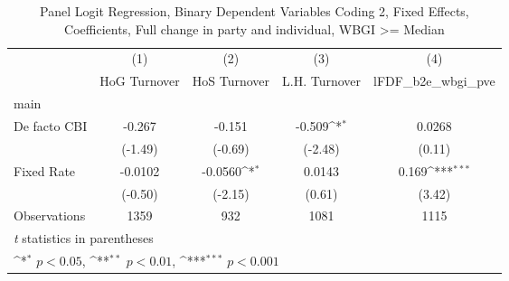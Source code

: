 \begin{table}[htbp]\centering
\def\sym#1{\ifmmode^{#1}\else\(^{#1}\)\fi}
\caption{Panel Logit Regression, Binary Dependent Variables Coding 2, Fixed Effects, Coefficients, Full change in party and individual, WBGI >= Median \label{logitFEMultInd2DF}}
\begin{tabular}{l*{4}{c}}
\toprule
                                        &\multicolumn{1}{c}{(1)}&\multicolumn{1}{c}{(2)}&\multicolumn{1}{c}{(3)}&\multicolumn{1}{c}{(4)}\\
                                        &\multicolumn{1}{c}{HoG Turnover}&\multicolumn{1}{c}{HoS Turnover}&\multicolumn{1}{c}{L.H. Turnover}&\multicolumn{1}{c}{lFDF\_b2e\_wbgi\_pve}\\
\midrule
main                                    &                  &                  &                  &                  \\
De facto CBI                            &   -0.267         &   -0.151         &   -0.509\sym{*}  &   0.0268         \\
                                        &  (-1.49)         &  (-0.69)         &  (-2.48)         &   (0.11)         \\
\addlinespace
Fixed Rate                              &  -0.0102         &  -0.0560\sym{*}  &   0.0143         &    0.169\sym{***}\\
                                        &  (-0.50)         &  (-2.15)         &   (0.61)         &   (3.42)         \\
\midrule
Observations                            &     1359         &      932         &     1081         &     1115         \\
\bottomrule
\multicolumn{5}{l}{\footnotesize \textit{t} statistics in parentheses}\\
\multicolumn{5}{l}{\footnotesize \sym{*} \(p<0.05\), \sym{**} \(p<0.01\), \sym{***} \(p<0.001\)}\\
\end{tabular}
\end{table}
